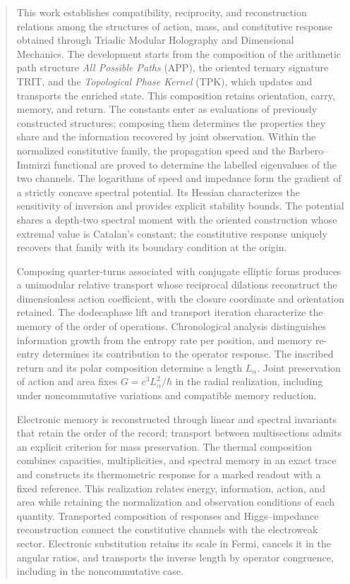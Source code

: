\begin{abstract}
This work establishes compatibility, reciprocity, and reconstruction
relations among the structures of action, mass, and constitutive response
obtained through Triadic Modular Holography and Dimensional Mechanics.
The development starts from the composition of the arithmetic path
structure \emph{All Possible Paths} (APP), the oriented ternary signature
TRIT, and the \emph{Topological Phase Kernel} (TPK), which updates and
transports the enriched state. This composition retains orientation,
carry, memory, and return. The constants enter as evaluations
of previously constructed structures; composing them determines the
properties they share and the information recovered by joint observation.
Within the normalized constitutive family, the propagation speed and the
Barbero--Immirzi functional are proved to determine the labelled
eigenvalues of the two channels. The logarithms of speed and impedance
form the gradient of a strictly concave spectral potential. Its Hessian
characterizes the sensitivity of inversion and provides explicit stability
bounds. The potential shares a depth-two spectral moment with the oriented
construction whose extremal value is Catalan's constant; the constitutive
response uniquely recovers that family with its boundary condition at
the origin.

Composing quarter-turns associated with conjugate elliptic forms produces
a unimodular relative transport whose reciprocal dilations reconstruct the
dimensionless action coefficient, with the closure coordinate and
orientation retained. The dodecaphase lift and transport iteration
characterize the memory of the order of operations. Chronological analysis
distinguishes information growth from the entropy rate per position, and
memory re-entry determines its contribution to the operator response.
The inscribed return and its polar composition determine a length
$L_\alpha$. Joint preservation of action and area fixes
$G=c^3L_\alpha^2/\hbar$ in the radial realization, including under
noncommutative variations and compatible memory reduction.

Electronic memory is reconstructed through linear and spectral invariants
that retain the order of the record; transport between multisections
admits an explicit criterion for mass preservation. The thermal
composition combines capacities, multiplicities, and spectral memory in
an exact trace and constructs its thermometric response for a marked
readout with a fixed reference. This realization relates energy,
information, action, and area while retaining the normalization and
observation conditions of each quantity.
Transported composition of responses and Higgs--impedance reconstruction
connect the constitutive channels with the electroweak sector. Electronic
substitution retains its scale in Fermi, cancels it in the angular ratios,
and transports the inverse length by operator congruence, including in
the noncommutative case.


\end{abstract}
